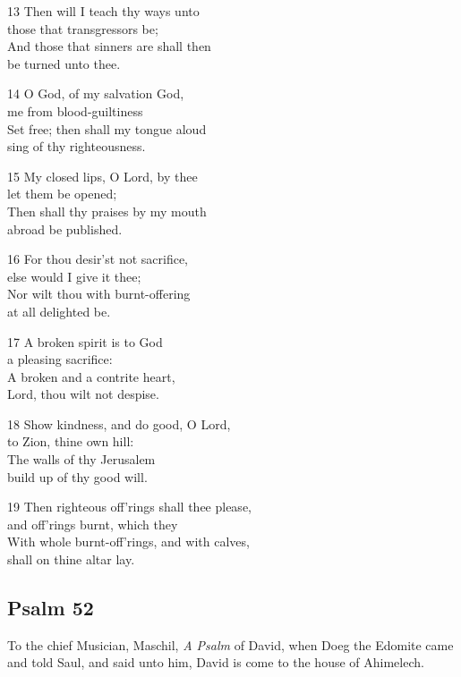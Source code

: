 13 Then will I teach thy ways unto\\
those that transgressors be;\\
And those that sinners are shall then\\
be turned unto thee.

14 O God, of my salvation God,\\
me from blood-guiltiness\\
Set free; then shall my tongue aloud\\
sing of thy righteousness.

15 My closed lips, O Lord, by thee\\
let them be opened;\\
Then shall thy praises by my mouth\\
abroad be published.

16 For thou desir’st not sacrifice,\\
else would I give it thee;\\
Nor wilt thou with burnt-offering\\
at all delighted be.

17 A broken spirit is to God\\
a pleasing sacrifice:\\
A broken and a contrite heart,\\
Lord, thou wilt not despise.

18 Show kindness, and do good, O Lord,\\
to Zion, thine own hill:\\
The walls of thy Jerusalem\\
build up of thy good will.

19 Then righteous off’rings shall thee please,\\
and off’rings burnt, which they\\
With whole burnt-off’rings, and with calves,\\
shall on thine altar lay.

\begin{center}
\quad{}\quad{}
\end{center}

\subsection*{Psalm 52}

To the chief Musician, Maschil, \emph{A Psalm} of David,
when Doeg the Edomite came and told Saul, and said unto him, David is come to the house of Ahimelech.


